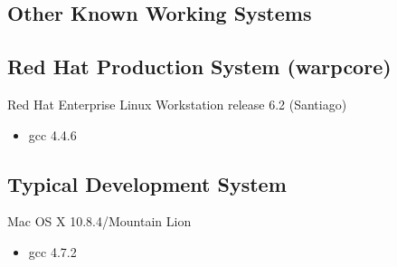\begin{appendices}
\section{Other Known Working Systems}
\label{sec:otherworking}

\subsection{Red Hat Production System (warpcore)}
Red Hat Enterprise Linux Workstation release 6.2 (Santiago)
\begin{itemize}
\item gcc 4.4.6
\end{itemize}

\subsection{Typical Development System}
Mac OS X 10.8.4/Mountain Lion
\begin{itemize}
\item gcc 4.7.2
\end{itemize}



\end{appendices}
